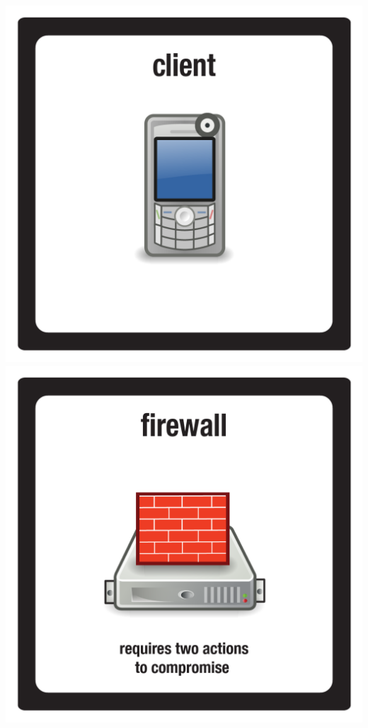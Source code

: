 \documentclass{letter}
\begin{document}
\includegraphics{tiles/node_client_mobile}
\includegraphics{tiles/node_firewall} \\
\end{document}
